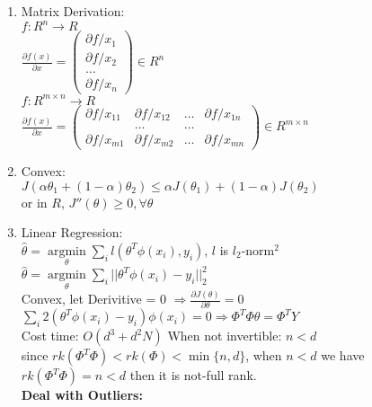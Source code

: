 \documentclass[10pt]{article}
\DeclareMathOperator*{\argmin}{\arg\min}
\begin{document}
\begin{multicols}{2}
    \begin{enumerate}
        \item Matrix Derivation:\\
        $f: R^n \rightarrow R$\\
        $\frac{\partial f(x)}{\partial x} = \begin{pmatrix}
            \partial f/ x_1 \\ \partial f/ x_2 \\
            \dots \\ \partial f/ x_n
        \end{pmatrix} \in R^{n}$\\
        $f: R^{m\times n} \rightarrow R$\\
        $\frac{\partial f(x)}{\partial x} = \begin{pmatrix}
            \partial f/ x_{11} & \partial f / x_{12} & \dots & \partial f/ x_{1n} \\ & \dots & \dots & \\
            \partial f/ x_{m1} & \partial f / x_{m2} & \dots & \partial f/ x_{mn}
        \end{pmatrix} \in R^{m\times n}$
        \item Convex:\\
        $J(\alpha \theta_1 + (1-\alpha)\theta_2) \le \alpha J(\theta_1) + (1-\alpha)J(\theta_2)$ \\
        or in $R$, $J''(\theta) \ge 0, \forall \theta$ 
        \item Linear Regression:\\
        $\hat{\theta} = \argmin\limits_{\theta}\sum_i l(\theta^T\phi(x_i), y_i)$, $l$ is $l_2$-norm$^2$\\
        $\hat{\theta} = \argmin\limits_{\theta}\sum_i ||\theta^T\phi(x_i)- y_i||_2^2$\\
        Convex, let Derivitive = 0 $\Rightarrow \frac{\partial J(\theta)}{\partial \theta} = 0$ \\
        $\sum_i 2(\theta^T\phi(x_i)-y_i)\phi(x_i) = 0 \Rightarrow \Phi^T\Phi\theta = \Phi^TY$ \\
        Cost time: $O(d^3 + d^2N)$
        When not invertible: $n < d$\\
        since $rk(\Phi^T\Phi) < rk(\Phi) < \min\{n,d\}$, when $n < d$ we have $rk(\Phi^T\Phi)  = n < d$ then it is not-full rank.\\
        \textbf{Deal with Outliers:}
        \begin{itemize}

\end{itemize}
\end{enumerate}
\end{multicols}
\end{document}
